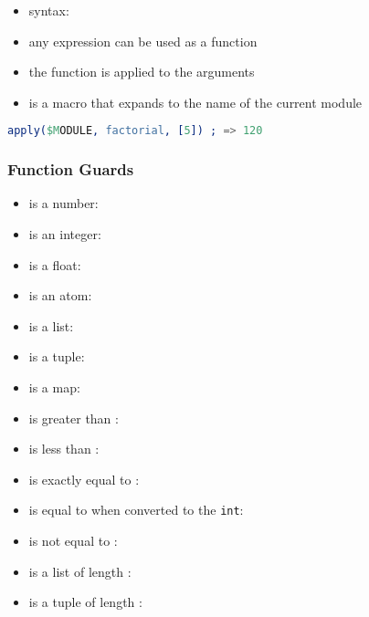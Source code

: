 \documentclass[a4paper,landscape,10pt]{article}
\begin{document}
\begin{multicols*}{2}
  \begin{itemize}
    \item syntax: 
    \item any expression can be used as a function
    \item the function is applied to the arguments
    \item {} is a macro that expands to the name of the current module
  \end{itemize}

  \begin{lstlisting}[language=Erlang]
% assumption:factorial is defined in the current module
apply($MODULE, factorial, [5]) ; => 120
\end{lstlisting}

  \subsubsection{Function Guards}

  \begin{itemize}
    \item {} is a number: 
    \item {} is an integer: 
    \item {} is a float: 
    \item {} is an atom: 
    \item {} is a list: 
    \item {} is a tuple: 
    \item {} is a map: 
    \item {} is greater than : 
    \item {} is less than : 
    \item {} is exactly equal to : 
    \item {} is equal to  when converted to the \texttt{int}: 
    \item {} is not equal to : 
    \item {} is a list of length : 
    \item {} is a tuple of length : 
  \end{itemize}


\end{multicols*}
\end{document}

